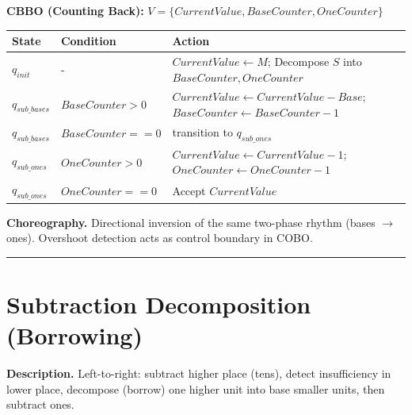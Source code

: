 \documentclass[12pt]{book}
\begin{document}
\textbf{CBBO (Counting Back):}
\(V = \{CurrentValue, BaseCounter, OneCounter\}\)

\begin{longtable}[]{@{}
  >{\raggedright\arraybackslash}p{}
  >{\raggedright\arraybackslash}p{}
  >{\raggedright\arraybackslash}p{}@{}}
\toprule\noalign{}
\begin{minipage}[b]{\linewidth}\raggedright
State
\end{minipage} & \begin{minipage}[b]{\linewidth}\raggedright
Condition
\end{minipage} & \begin{minipage}[b]{\linewidth}\raggedright
Action
\end{minipage} \\
\midrule\noalign{}
\endhead
\bottomrule\noalign{}
\endlastfoot
\(q_{init}\) & - & \(CurrentValue \leftarrow M\); Decompose \(S\) into
\(BaseCounter, OneCounter\) \\
\(q_{sub\_bases}\) & \(BaseCounter > 0\) &
\(CurrentValue \leftarrow CurrentValue - Base\);
\(BaseCounter \leftarrow BaseCounter - 1\) \\
\(q_{sub\_bases}\) & \(BaseCounter == 0\) & transition to
\(q_{sub\_ones}\) \\
\(q_{sub\_ones}\) & \(OneCounter > 0\) &
\(CurrentValue \leftarrow CurrentValue - 1\);
\(OneCounter \leftarrow OneCounter - 1\) \\
\(q_{sub\_ones}\) & \(OneCounter == 0\) & Accept \(CurrentValue\) \\
\end{longtable}

\textbf{Choreography.} Directional inversion of the same two-phase
rhythm (bases \(\to\) ones). Overshoot detection acts as control
boundary in COBO.

\begin{center}\rule{0.5\linewidth}{0.5pt}\end{center}

\section{Subtraction Decomposition
(Borrowing)}\label{subtraction-decomposition-borrowing}

\textbf{Description.} Left-to-right: subtract higher place (tens),
detect insufficiency in lower place, decompose (borrow) one higher unit
into base smaller units, then subtract ones.
\end{document}
